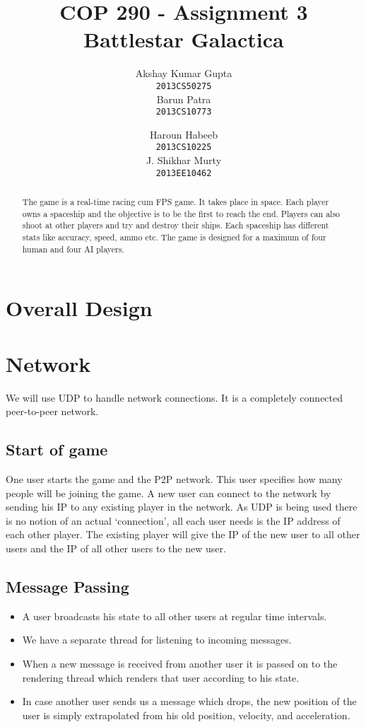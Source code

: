 \documentclass[]{article}
\newcommand{\ty}[1]{\texttt{#1}}
\begin{document}
\title{COP 290 - Assignment 3\\Battlestar Galactica}
\author{Akshay Kumar Gupta\\ \ty{2013CS50275} \\[.1in]  Barun Patra\\ \ty{2013CS10773} \and  Haroun Habeeb\\ \ty{2013CS10225} \\[.1in] J. Shikhar Murty\\ \ty{2013EE10462}}
\date{}
\maketitle
\begin{abstract}
\noindent The game is a real-time racing cum FPS game. It takes place in space. Each player owns a spaceship and the objective is to be the first to reach the end. Players can also shoot at other players and try and destroy their ships. Each spaceship has different stats like accuracy, speed, ammo etc. The game is designed for a maximum of four human and four AI players.
\end{abstract}
\section{Overall Design}
\section{Network}
We will use UDP to handle network connections. It is a completely connected peer-to-peer network.
\subsection{Start of game}
One user starts the game and the P2P network. This user specifies how many people will be joining the game. A new user can connect to the network by sending his IP to any existing player in the network. As UDP is being used there is no notion of an actual `connection', all each user needs is the IP address of each other player. The existing player will give the IP of the new user to all other users and the IP of all other users to the new user.
\subsection{Message Passing}
\begin{itemize}
\item A user broadcasts his state to all other users at regular time intervals.
\item We have a separate thread for listening to incoming messages. 
\item When a new message is received from another user it is passed on to the rendering thread which renders that user according to his state.
\item In case another user sends us a message which drops, the new position of the user is simply extrapolated from his old position, velocity, and acceleration.
\end{itemize}
\end{document}
